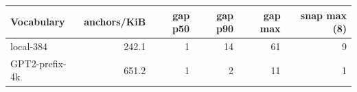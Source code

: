 \begin{tabular}{@{}lrrrrr@{}}
\toprule
Vocabulary & anchors/KiB & gap p50 & gap p90 & gap max & snap max (8) \\
\midrule
local-384 & 242.1 & 1 & 14 & 61 & 9 \\
GPT2-prefix-4k & 651.2 & 1 & 2 & 11 & 1 \\
\bottomrule
\end{tabular}
